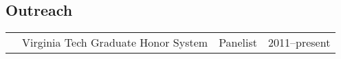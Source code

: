 \documentclass[10pt,letterpaper]{article}
\makeatletter
\newcommand{\rowtabular}[4][3.7in]{%
  \begin{tabularx}{\linewidth}{p{24pt} @{}p{#1} X r@{}}%
    & #2 & #3 & #4 \\ [1.0pt]%
  \end{tabularx}%
}
\renewcommand{\textsuperscript}[1]{%
  \raisebox{2.5pt}{\scriptsize \hspace{0.3pt}#1}%
}
\makeatother
\begin{document}
\subsection*{Outreach}
\rowtabular{Virginia Tech Graduate Honor System}{Panelist}{2011--present}






\end{document}
